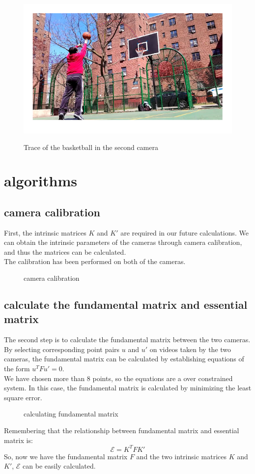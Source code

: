 \documentclass[10pt,journal,compsoc]{IEEEtran}
\begin{document}
\begin{figure}[h]
\subfloat
{
\includegraphics[width=3.4 in]{balltrace_wei.png}
}
\caption{Trace of the basketball in the second camera}
\end{figure}

\section{\textbf{algorithms}}
\subsection{camera calibration}
First, the intrinsic matrices $K$ and $K'$ are required in our future calculations. We can obtain the intrinsic parameters
of the cameras through camera calibration, and thus the matrices can be calculated.\\
The calibration has been performed on both of the cameras.\\
\begin{figure}[h]
\centering
\caption{camera calibration}
\end{figure}

\subsection{calculate the fundamental matrix and essential matrix}
The second step is to calculate the fundamental matrix between the two cameras. By selecting corresponding point pairs $u$ 
and $u'$ on videos taken by the two cameras, the fundamental matrix can be calculated by establishing equations of the form
 $u^{T}Fu'=0$. \\
 We have chosen more than 8 points, so the equations are a over constrained system. In this case, the 
 fundamental matrix is calculated by minimizing the least square error.\\
\begin{figure}[h]
\centering
{}
\caption{calculating fundamental matrix}
\end{figure}
Remembering that the relationship between fundamental matrix and essential matrix is:
\begin{equation}
\mathcal{E} = K^{T}FK'
\end{equation}
So, now we have the fundamental matrix $F$ and the two intrinsic matrices $K$ and $K'$, $\mathcal{E}$ can be
easily calculated.
\end{document}

